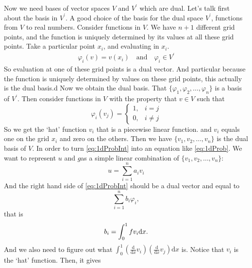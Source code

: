 Now we need bases of vector spaces $V$ and $V^\prime$ which are dual. Let's talk first about the basis in $V^\prime$. A good choice of the basis for the dual space $V^\prime$, functions from $V$ to real numbers. Consider functions in $V$. We have $n+1$ different grid points, and the function is uniquely determined by its values at all these grid points. Take a particular point $x_i$, and evaluating in $x_i$.
\begin{equation}
\begin{split}
\varphi_{i} (v) = v(x_i)\quad \textrm{and}\quad
\varphi_{i} \in V^\prime
\end{split}
\end{equation}
So evaluation at one of these grid points is a dual vector. And particular because the function is uniquely determined by values on these grid points, this actually is the dual basis.d
Now we obtain the dual basis. That $\{ \varphi_1, \varphi_2, \ldots, \varphi_n\}$ is a basis of $V^\prime$.
Then consider functions in $V$ with the property that $v\in V$ such that 
\begin{equation}
\varphi_i (v_j) = \left\{
	\begin{array}{cc}
	1, & i=j \\
	0, & i\ne j
	\end{array} \right.
\end{equation}
So we get the `hat' function $v_i$ that is a piecewise linear function. and $v_i$ equals one on the grid $x_i$ and zero on the others. Then we have $\{ v_1, v_2, \ldots, v_n \}$ is the dual basis of $V$.
In order to turn \eqref{eq:1dProbInt} into an equation like \eqref{eq:1dProb}. We want to represent $u$ and $g$as a simple linear combination of $\{ v_1, v_2, \ldots, v_n \}$:
\begin{equation}
u = \sum_{i=1}^n a_i v_i
\end{equation}
And the right hand side of \eqref{eq:1dProbInt} should be a dual vector and equal to 
\begin{equation}
\sum_{i=1}^n b_i \varphi_i, 
\end{equation}
that is
\begin{equation}
b_i = \int_0^1 f v_i {\rm d}x.
\end{equation}
And we also need to figure out what $\int_0^1 \left( \frac{\textrm{d}}{\textrm{d} x} v_i \right) \left( \frac{\textrm{d}}{\textrm{d} x} v_j \right) \textrm{d}x$ is. Notice that $v_i$ is the `hat' function. Then, it gives 

